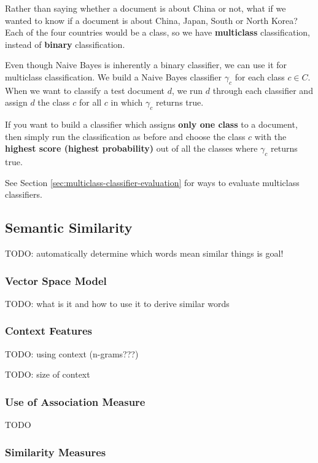 \documentclass{article}
\begin{document}
Rather than saying whether a document is about China or not, what if we wanted to know if a document is about China, Japan, South or North Korea? Each of the four countries would be a class, so we have \textbf{multiclass} classification, instead of \textbf{binary} classification.

Even though Naive Bayes is inherently a binary classifier, we can use it for multiclass classification. We build a Naive Bayes classifier $\gamma_c$ for each class $c \in C$. When we want to classify a test document $d$, we run $d$ through each classifier and assign $d$ the class $c$ for all $c$ in which $\gamma_c$ returns true.

If you want to build a classifier which assigns \textbf{only one class} to a document, then simply run the classification as before and choose the class $c$ with the \textbf{highest score (highest probability)} out of all the classes where $\gamma_c$ returns true.

See Section \ref{sec:multiclass-classifier-evaluation} for ways to evaluate multiclass classifiers.

\subsection{Semantic Similarity}

TODO: automatically determine which words mean similar things is goal!

\subsubsection{Vector Space Model}

TODO: what is it and how to use it to derive similar words

\subsubsection{Context Features}

TODO: using context (n-grams???)

TODO: size of context

\subsubsection{Use of Association Measure}

TODO

\subsubsection{Similarity Measures}
\end{document}
